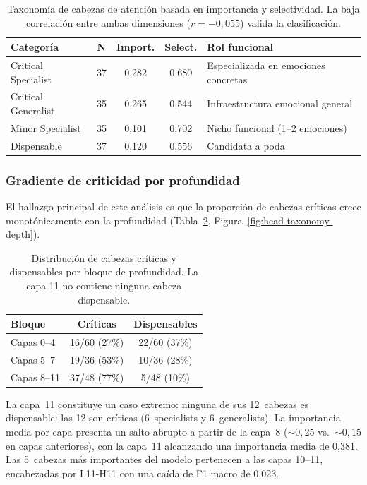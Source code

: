 \begin{table}[ht]
\centering
\caption{Taxonomía de cabezas de atención basada en importancia y
selectividad. La baja correlación entre ambas dimensiones
($r = -0{,}055$) valida la clasificación.}
\label{tab:head-taxonomy}
\begin{tabular}{lcccl}
\toprule
\textbf{Categoría} & \textbf{N} & \textbf{Import.} & \textbf{Select.} & \textbf{Rol funcional} \\
\midrule
Critical Specialist & 37 & 0{,}282 & 0{,}680 & Especializada en emociones concretas \\
Critical Generalist & 35 & 0{,}265 & 0{,}544 & Infraestructura emocional general \\
Minor Specialist    & 35 & 0{,}101 & 0{,}702 & Nicho funcional (1--2 emociones) \\
Dispensable         & 37 & 0{,}120 & 0{,}556 & Candidata a poda \\
\bottomrule
\end{tabular}
\end{table}

\subsubsection{Gradiente de criticidad por profundidad}

El hallazgo principal de este análisis es que la proporción de cabezas
críticas crece monotónicamente con la profundidad
(Tabla~\ref{tab:head-profundidad}, Figura~\ref{fig:head-taxonomy-depth}).

\begin{table}[ht]
\centering
\caption{Distribución de cabezas críticas y dispensables por bloque de
profundidad. La capa 11 no contiene ninguna cabeza dispensable.}
\label{tab:head-profundidad}
\begin{tabular}{lcc}
\toprule
\textbf{Bloque} & \textbf{Críticas} & \textbf{Dispensables} \\
\midrule
Capas 0--4  & 16/60 (27\%) & 22/60 (37\%) \\
Capas 5--7  & 19/36 (53\%) & 10/36 (28\%) \\
Capas 8--11 & 37/48 (77\%) & \phantom{0}5/48 (10\%) \\
\bottomrule
\end{tabular}
\end{table}

La capa~11 constituye un caso extremo: ninguna de sus 12~cabezas es
dispensable: las 12 son críticas (6~specialists y 6~generalists). La
importancia media por capa presenta un salto abrupto a partir de la
capa~8 ($\sim 0{,}25$ vs.\ $\sim 0{,}15$ en capas anteriores), con la
capa~11 alcanzando una importancia media de 0{,}381. Las 5~cabezas más
importantes del modelo pertenecen a las capas 10--11, encabezadas por
L11-H11 con una caída de F1 macro de 0{,}023.

